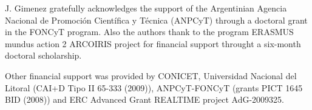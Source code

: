 \documentclass[review]{elsarticle}
\begin{document}
J. Gimenez gratefully acknowledges the support of the Argentinian Agencia Nacional de Promoci\'on Cient\'ifica y T\' ecnica (ANPCyT) through a doctoral grant in the FONCyT program. Also the authors thank to the program ERASMUS mundus action 2 ARCOIRIS project for financial support throught a six-month doctoral scholarship.

Other financial support was provided by CONICET, Universidad Nacional del Litoral (CAI+D Tipo II 65-333 (2009)), ANPCyT-FONCyT (grants PICT 1645 BID (2008)) and ERC Advanced Grant REALTIME project AdG-2009325.





%
%
%
\end{document}
